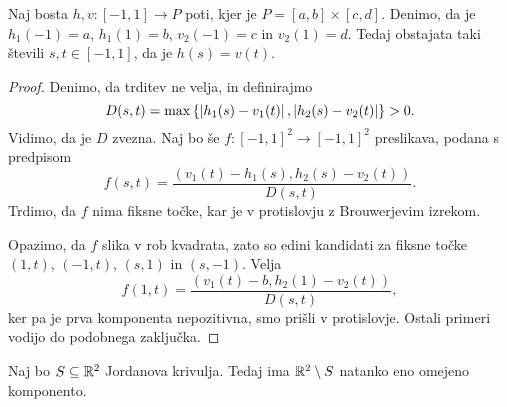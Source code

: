 \begin{lema}\label{lm:sk}
Naj bosta $h, v \colon [-1, 1] \to P$ poti, kjer je
$P = [a, b] \times [c, d]$. Denimo, da je $h_1(-1) = a$,
$h_1(1) = b$, $v_2(-1) = c$ in $v_2(1) = d$. Tedaj obstajata taki
števili $s, t \in [-1, 1]$, da je $h(s) = v(t)$.
\end{lema}

\begin{proof}
Denimo, da trditev ne velja, in definirajmo
\[
D(s, t) =
\max \left\{\left\lvert h_1(s) - v_1(t)\right\rvert, \left\lvert h_2(s) - v_2(t)\right\rvert\right\} > 0.
\]
Vidimo, da je $D$ zvezna. Naj bo še
$f \colon [-1, 1]^2 \to [-1, 1]^2$ preslikava, podana s predpisom
\[
f(s, t) = \frac{(v_1(t) - h_1(s),h_2(s) - v_2(t))}{D(s, t)}.
\]
Trdimo, da $f$ nima fiksne točke, kar je v protislovju z
Brouwerjevim izrekom.

Opazimo, da $f$ slika v rob kvadrata, zato so edini kandidati za
fiksne točke $(1, t)$, $(-1, t)$, $(s, 1)$ in $(s, -1)$. Velja
\[
f(1, t) = \frac{(v_1(t) - b, h_2(1) - v_2(t))}{D(s, t)},
\]
ker pa je prva komponenta nepozitivna, smo prišli v protislovje.
Ostali primeri vodijo do podobnega zaključka.
\end{proof}

\begin{trditev}
Naj bo $S \subseteq \mathbb{R}^2$ Jordanova krivulja. Tedaj ima
$\mathbb{R}^2 \setminus S$ natanko eno omejeno komponento.
\end{trditev}

